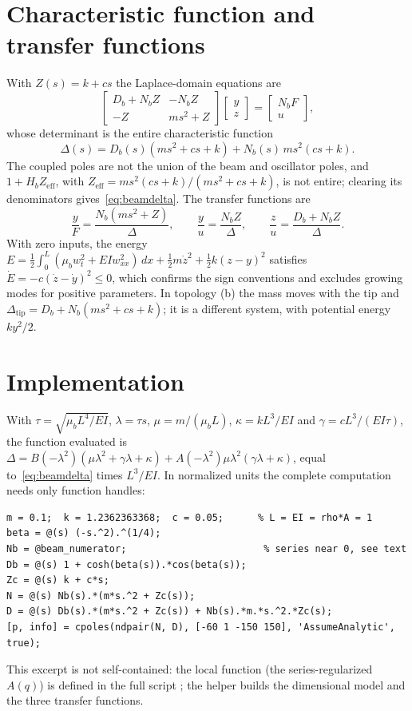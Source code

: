 \section{Characteristic function and transfer functions}

With $Z(s)=k+cs$ the Laplace-domain equations are
\[
  \begin{bmatrix}D_b+N_bZ & -N_bZ\\ -Z & ms^2+Z\end{bmatrix}
  \begin{bmatrix}y\\ z\end{bmatrix}=
  \begin{bmatrix}N_bF\\ u\end{bmatrix},
\]
whose determinant is the entire characteristic function
\begin{equation}
  \Delta(s)=D_b(s)(ms^2+cs+k)+N_b(s)\,ms^2(cs+k) .
  \label{eq:beamdelta}
\end{equation}
The coupled poles are not the union of the beam and oscillator poles, and
$1+H_bZ_{\mathrm{eff}}$, with $Z_{\mathrm{eff}}=ms^2(cs+k)/(ms^2+cs+k)$, is
not entire; clearing its denominators gives~\eqref{eq:beamdelta}. The
transfer functions are
\[
  \frac yF=\frac{N_b(ms^2+Z)}{\Delta},\qquad
  \frac yu=\frac{N_bZ}{\Delta},\qquad
  \frac zu=\frac{D_b+N_bZ}{\Delta}.
\]
With zero inputs, the energy
$E=\tfrac12\int_0^L(\mu_bw_t^2+EIw_{xx}^2)\,dx+\tfrac12m\dot z^2+\tfrac12k(z-y)^2$
satisfies $\dot E=-c(\dot z-\dot y)^2\le0$, which confirms the sign
conventions and excludes growing modes for positive parameters. In topology
(b) the mass moves with the tip and $\Delta_{\mathrm{tip}}=D_b+N_b(ms^2+cs+k)$;
it is a different system, with potential energy $ky^2/2$.

\section{Implementation}

With $\tau=\sqrt{\mu_bL^4/EI}$, $\lambda=\tau s$, $\mu=m/(\mu_bL)$,
$\kappa=kL^3/EI$ and $\gamma=cL^3/(EI\tau)$, the function evaluated is
$\Delta=B(-\lambda^2)(\mu\lambda^2+\gamma\lambda+\kappa)+A(-\lambda^2)\mu\lambda^2(\gamma\lambda+\kappa)$,
equal to~\eqref{eq:beamdelta} times $L^3/EI$. In normalized units the
complete computation needs only function handles:
\begin{lstlisting}
m = 0.1;  k = 1.2362363368;  c = 0.05;      % L = EI = rho*A = 1
beta = @(s) (-s.^2).^(1/4);
Nb = @beam_numerator;                        % series near 0, see text
Db = @(s) 1 + cosh(beta(s)).*cos(beta(s));
Zc = @(s) k + c*s;
N = @(s) Nb(s).*(m*s.^2 + Zc(s));
D = @(s) Db(s).*(m*s.^2 + Zc(s)) + Nb(s).*m.*s.^2.*Zc(s);
[p, info] = cpoles(ndpair(N, D), [-60 1 -150 150], 'AssumeAnalytic', true);
\end{lstlisting}
This excerpt is not self-contained: the local function
 (the series-regularized $A(q)$) is defined in the full
script ; the
helper  builds the dimensional
model and the three transfer functions.

